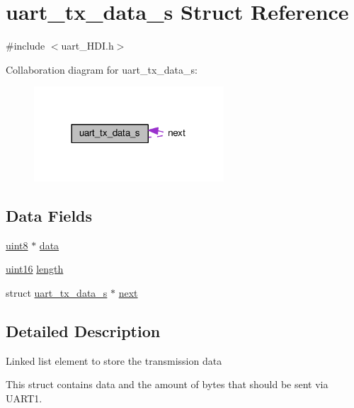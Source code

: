 \hypertarget{structuart__tx__data__s}{}\section{uart\+\_\+tx\+\_\+data\+\_\+s Struct Reference}
\label{structuart__tx__data__s}


{\ttfamily \#include $<$uart\+\_\+\+H\+D\+I.\+h$>$}



Collaboration diagram for uart\+\_\+tx\+\_\+data\+\_\+s\+:\nopagebreak
\begin{figure}[H]
\begin{center}
\leavevmode
\includegraphics[width=201pt]{da/d8f/structuart__tx__data__s__coll__graph}
\end{center}
\end{figure}
\subsection*{Data Fields}
\begin{DoxyCompactItemize}
\item 
\hyperlink{definitions_8h_adde6aaee8457bee49c2a92621fe22b79}{uint8} $\ast$ \hyperlink{structuart__tx__data__s_a8c8a4dcb88914689fbcf3c605e7e086a}{data}
\item 
\hyperlink{definitions_8h_a05f6b0ae8f6a6e135b0e290c25fe0e4e}{uint16} \hyperlink{structuart__tx__data__s_a5f6561e844d7ba918becf2eeadfa7fdf}{length}
\item 
struct \hyperlink{structuart__tx__data__s}{uart\+\_\+tx\+\_\+data\+\_\+s} $\ast$ \hyperlink{structuart__tx__data__s_a1ca59d43b0ec489235518ce3037eb350}{next}
\end{DoxyCompactItemize}


\subsection{Detailed Description}
Linked list element to store the transmission data

This struct contains data and the amount of bytes that should be sent via U\+A\+R\+T1. 

